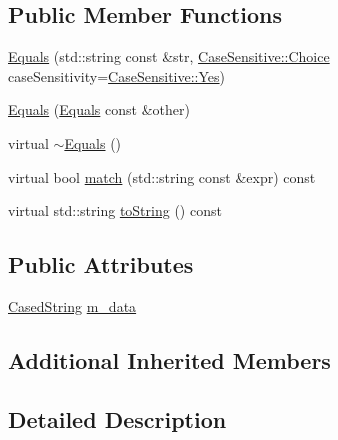 \subsection*{Public Member Functions}
\begin{DoxyCompactItemize}
\item 
\hyperlink{struct_catch_1_1_matchers_1_1_impl_1_1_std_string_1_1_equals_a5921d5ed75320fb64a678e3f1292a464}{Equals} (std\+::string const \&str, \hyperlink{struct_catch_1_1_case_sensitive_aad49d3aee2d97066642fffa919685c6a}{Case\+Sensitive\+::\+Choice} case\+Sensitivity=\hyperlink{struct_catch_1_1_case_sensitive_aad49d3aee2d97066642fffa919685c6aa7c5550b69ec3c502e6f609b67f9613c6}{Case\+Sensitive\+::\+Yes})
\item 
\hyperlink{struct_catch_1_1_matchers_1_1_impl_1_1_std_string_1_1_equals_acaa97de06aedf363ae803d65a975f5e4}{Equals} (\hyperlink{struct_catch_1_1_matchers_1_1_impl_1_1_std_string_1_1_equals}{Equals} const \&other)
\item 
virtual \hyperlink{struct_catch_1_1_matchers_1_1_impl_1_1_std_string_1_1_equals_ad34af04f636ec84d7c613ead32f20c3f}{$\sim$\+Equals} ()
\item 
virtual bool \hyperlink{struct_catch_1_1_matchers_1_1_impl_1_1_std_string_1_1_equals_abf0a94b4e66dbd586268d9983f867e68}{match} (std\+::string const \&expr) const
\item 
virtual std\+::string \hyperlink{struct_catch_1_1_matchers_1_1_impl_1_1_std_string_1_1_equals_ab0d73961b95d9836d77b9e2e94c3790b}{to\+String} () const
\end{DoxyCompactItemize}
\subsection*{Public Attributes}
\begin{DoxyCompactItemize}
\item 
\hyperlink{struct_catch_1_1_matchers_1_1_impl_1_1_std_string_1_1_cased_string}{Cased\+String} \hyperlink{struct_catch_1_1_matchers_1_1_impl_1_1_std_string_1_1_equals_ae09964b7ba291ce574b514a2ee3eddb0}{m\+\_\+data}
\end{DoxyCompactItemize}
\subsection*{Additional Inherited Members}


\subsection{Detailed Description}


